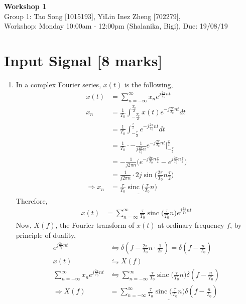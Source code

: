 \documentclass[11pt]{article}
\DeclareMathOperator{\sinc}{sinc}
\begin{document}



\newpage

\begin{center}
\textbf{\Large{Workshop 1}}\\
Group 1: Tao Song [1015193], YiLin Inez Zheng [702279], \\
Workshop: Monday 10:00am - 12:00pm (Shalanika, Bigi), Due: 19/08/19  
\end{center}

\section{Input Signal [8 marks]}
\begin{enumerate}[label=(\alph*)]
    \item %
    In a complex Fourier series, $x(t)$ is the following,
    \begin{align*}
        x(t) &= \sum_{n = -\infty}^{\infty}x_n e^{j \frac{2\pi}{T_0} nt}\\
        x_n &= \frac{1}{T_0} \int^{\frac{T_0}{2}}_{-\frac{T_0}{2}} x(t) e^{-j \frac{2\pi}{T_0} nt} dt \\
        &= \frac{1}{T_0} \int^{\frac{\tau}{2}}_{-\frac{\tau}{2}} e^{-j \frac{2\pi}{T_0} nt} dt\\
        &= \frac{1}{T_0} \cdot -\frac{1}{j\frac{2\pi}{T_0}n} e^{-j \frac{2\pi}{T_0} nt} \Biggr|_{-\frac{\tau}{2}}^{\frac{\tau}{2}}\\
        &= -\frac{1}{j2\pi n} \Big(
        e^{-j \frac{2\pi}{T_0}n\frac{\tau}{2}} 
        -e^{j \frac{2\pi}{T_0}n\frac{\tau}{2}}\Big)\\
        &= \frac{1}{j2\pi n} \cdot 2j\sin\Big(\frac{2\pi}{T_0}n\frac{\tau}{2}\Big)\\
        \Rightarrow x_n &= \underline{\frac{\tau}{T_0}\sinc \Big(\frac{\tau}{T_0}n\Big)} 
    \end{align*}
    Therefore,
    \begin{align*}
        x(t) &= \sum_{n = \infty}^{\infty} \frac{\tau}{T_0}\sinc \Big(\frac{\tau}{T_0}n\Big) e^{j \frac{2\pi}{T_0} nt}
    \end{align*}
    Now, $X(f)$, the Fourier transform of $x(t)$ at ordinary frequency $f$, by principle of duality,
    \begin{align*}
        e^{j \frac{2\pi}{T_0} nt} &\leftrightharpoons \delta(f - \frac{2\pi}{T_0} n \cdot \frac{1}{2\pi}) = \delta(f - \frac{n}{T_0})\\
        x(t) &\leftrightharpoons X(f)\\
        \sum_{n = -\infty}^{\infty}x_n e^{j \frac{2\pi}{T_0} nt} 
        &\leftrightharpoons \sum_{n = -\infty}^{\infty} \frac{\tau}{T_0}\sinc \Big(\frac{\tau}{T_0}n\Big)\delta(f - \frac{n}{T_0})\\
        \Rightarrow X(f) &= \underline{\sum_{n = -\infty}^{\infty} \frac{\tau}{T_0}\sinc \Big(\frac{\tau}{T_0}n\Big)\delta(f - \frac{n}{T_0})}
    \end{align*}
    

\end{enumerate}
\end{document}

